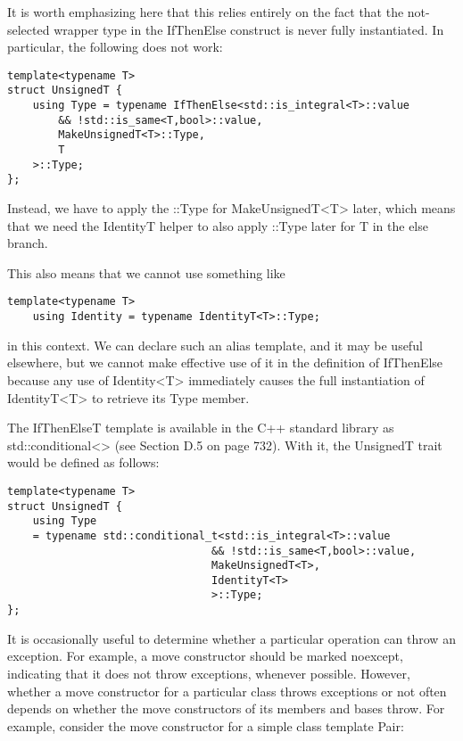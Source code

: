 It is worth emphasizing here that this relies entirely on the fact that the not-selected wrapper type in the IfThenElse construct is never fully instantiated. In particular, the following does not work:

\begin{lstlisting}[style=styleCXX]
template<typename T>
struct UnsignedT {
	using Type = typename IfThenElse<std::is_integral<T>::value
		&& !std::is_same<T,bool>::value,
		MakeUnsignedT<T>::Type,
		T
	>::Type;
};
\end{lstlisting}

Instead, we have to apply the ::Type for MakeUnsignedT<T> later, which means that we need the IdentityT helper to also apply ::Type later for T in the else branch.

This also means that we cannot use something like

\begin{lstlisting}[style=styleCXX]
template<typename T>
	using Identity = typename IdentityT<T>::Type;
\end{lstlisting}

in this context. We can declare such an alias template, and it may be useful elsewhere, but we cannot make effective use of it in the definition of IfThenElse because any use of Identity<T> immediately causes the full instantiation of IdentityT<T> to retrieve its Type member.

The IfThenElseT template is available in the C++ standard library as std::conditional<> (see Section D.5 on page 732). With it, the UnsignedT trait would be defined as follows:

\begin{lstlisting}[style=styleCXX]
template<typename T>
struct UnsignedT {
	using Type
	= typename std::conditional_t<std::is_integral<T>::value
								&& !std::is_same<T,bool>::value,
								MakeUnsignedT<T>,
								IdentityT<T>
								>::Type;
};
\end{lstlisting}


It is occasionally useful to determine whether a particular operation can throw an exception. For example, a move constructor should be marked noexcept, indicating that it does not throw exceptions, whenever possible. However, whether a move constructor for a particular class throws exceptions or not often depends on whether the move constructors of its members and bases throw. For example, consider the move constructor for a simple class template Pair:

